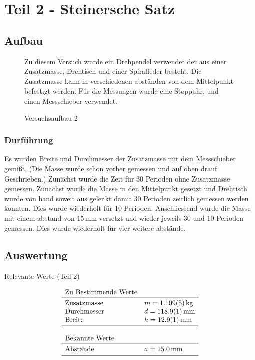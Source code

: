 \documentclass[11pt,a4paper]{article}
\newcommand{\halftime}[4]{\begin{figure}[h]
\begin{minipage}{.#1\textwidth}#3\end{minipage}\begin{minipage}{.#2\textwidth}
\centering
#4\end{minipage}
\end{figure}}
\begin{document}
\pagebreak

\section{Teil 2 - Steinersche Satz}

\subsection{Aufbau}

\halftime{5}{5}{Zu diesem Versuch wurde ein Drehpendel verwendet der aus einer Zusatzmasse, Drehtisch und einer Spiralfeder besteht. Die Zusatzmasse kann in verschiedenen abständen von dem Mittelpunkt befestigt werden. Für die Messungen wurde eine Stoppuhr, und einen Messschieber verwendet.}{
\centering
\fbox{\texttt{[image: Drehp]}}
   \renewcommand\thefigure{B2}
\caption[Versuchsaufbau 2]{Versuchsaufbau 2 \cite{Anleitung}}
\label{B2}
}

\subsubsection{Durführung}

Es wurden Breite und Durchmesser der Zusatzmasse mit dem Messschieber gemißt. (Die Masse wurde schon vorher gemessen und auf oben drauf Geschrieben.) Zunächst wurde die Zeit für 30 Perioden ohne Zusatzmasse gemessen. Zunächst wurde die Masse in den Mittelpunkt gesetzt und Drehtisch wurde von hand soweit aus gelenkt damit 30 Perioden zeitlich gemessen werden konnten. Dies wurde wiederholt für 10 Perioden. Anschliessend wurde die Masse mit einem abstand von 15\,mm versetzt und wieder jeweils 30 und 10 Perioden gemessen. Dies wurde wiederholt für vier weitere abstände. 

\subsection{Auswertung}

\begin{table}[ht]
\caption{Relevante Werte (Teil 2)}
$$
\begin{array}{ll}
	\multicolumn{1}{l}{\textrm{Zu Bestimmende Werte}} \\
	\toprule 
	\textrm{Zusatzmasse} & m = 1.109(5)\,\textrm{kg} \\
	\textrm{Durchmesser} & d = 118.9(1)\,\textrm{mm} \\
	\textrm{Breite} & h = 12.9(1)\,\textrm{mm} \\
	\bottomrule \\
	\multicolumn{2}{l}{\textrm{Bekannte Werte}} \\
	\toprule
	\textrm{Abstände} & a = 15.0\,\textrm{mm}\\
	\bottomrule 
\end{array}
$$
\end{table}
\end{document}
